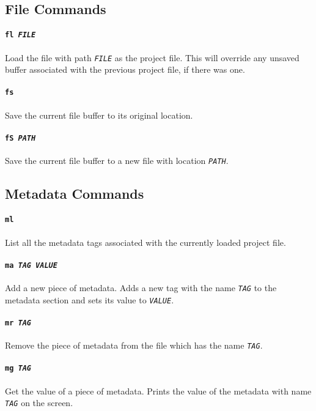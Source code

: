 \documentclass[a4paper]{article}
\begin{document}
\subsection{File Commands}

\paragraph{\texttt{fl \textit{FILE}}}
Load the file with path \texttt{\textit{FILE}} as the project file. This will 
override any unsaved buffer associated with the previous project file, if there 
was one.

\paragraph{\texttt{fs}}
Save the current file buffer to its original location.

\paragraph{\texttt{fS \textit{PATH}}}
Save the current file buffer to a new file with location \texttt{\textit{PATH}}.

\subsection{Metadata Commands}

\paragraph{\texttt{ml}}
List all the metadata tags associated with the currently loaded project
file.

\paragraph{\texttt{ma \textit{TAG VALUE}}}
Add a new piece of metadata. Adds a new tag with the name \texttt{\textit{TAG}}
to the metadata section and sets its value to \texttt{\textit{VALUE}}.

\paragraph{\texttt{mr \textit{TAG}}}
Remove the piece of metadata from the file which has the name 
\texttt{\textit{TAG}}.

\paragraph{\texttt{mg \textit{TAG}}}
Get the value of a piece of metadata. Prints the value of the metadata with
name \texttt{\textit{TAG}} on the screen.
\end{document}
